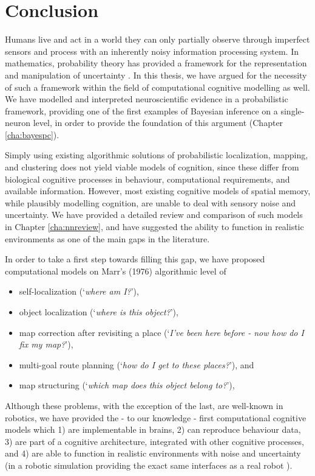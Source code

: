 \chapter{Conclusion}
\label{cha:conclusion}

Humans live and act in a world they can only partially observe through imperfect sensors and process with an inherently noisy information processing system. In mathematics, probability theory has provided a framework for the representation and manipulation of uncertainty \citep{jaynes1996probability}. In this thesis, we have argued for the necessity of such a framework within the field of computational cognitive modelling as well. We have modelled and interpreted neuroscientific evidence in a probabilistic framework, providing one of the first examples of Bayesian inference on a single-neuron level, in order to provide the foundation of this argument (Chapter \ref{cha:bayespc}). 

Simply using existing algorithmic solutions of probabilistic localization, mapping, and clustering does not yield viable models of cognition, since these differ from biological cognitive processes in behaviour, computational requirements, and available information. However, most existing cognitive models of spatial memory, while plausibly modelling cognition, are unable to deal with sensory noise and uncertainty. We have provided a detailed review and comparison of such models in Chapter \ref{cha:nnreview}, and have suggested the ability to function in realistic environments as one of the main gaps in the literature.

In order to take a first step towards filling this gap, we have proposed computational models on Marr's (1976) algorithmic level of

\begin{itemize}
	\item self-localization (`\textit{where am I?}'),
	\item object localization (`\textit{where is this object?}'),
	\item map correction after revisiting a place (`\textit{I've been here before - now how do I fix my map?}'), 
	\item multi-goal route planning (`\textit{how do I get to these places?}'), and
	\item map structuring (`\textit{which map does this object belong to?}'),
\end{itemize}

Although these problems, with the exception of the last, are well-known in robotics, we have provided the - to our knowledge - first computational cognitive models which 1) are implementable in brains, 2) can reproduce behaviour data, 3) are part of a cognitive architecture, integrated with other cognitive processes, and 4) are able to function in realistic environments with noise and uncertainty (in a robotic simulation providing the exact same interfaces as a real robot \citep{rusu2007extending}). 

